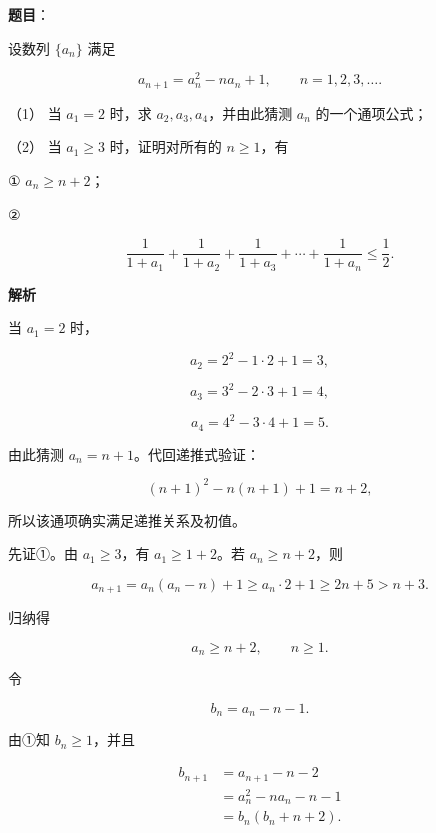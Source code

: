 \begin{answer}

\textbf{题目}：

设数列 $\{a_n\}$ 满足

\nopagebreak[4]
\[
a_{n+1}=a_n^2-na_n+1,\qquad n=1,2,3,\ldots.
\]

（1） 当 $a_1=2$ 时，求 $a_2,a_3,a_4$，并由此猜测 $a_n$ 的一个通项公式；

（2） 当 $a_1\geqslant3$ 时，证明对所有的 $n\geqslant1$，有

① $a_n\geqslant n+2$；

②

\nopagebreak[4]
\[
\frac1{1+a_1}+\frac1{1+a_2}+\frac1{1+a_3}+\cdots+\frac1{1+a_n}\leqslant\frac12.
\]

\textbf{解析}


当 $a_1=2$ 时，

\nopagebreak[4]
\[
a_2=2^2-1\cdot2+1=3,
\]

\nopagebreak[4]
\[
a_3=3^2-2\cdot3+1=4,
\]

\nopagebreak[4]
\[
a_4=4^2-3\cdot4+1=5.
\]

由此猜测 $a_n=n+1$。代回递推式验证：

\nopagebreak[4]
\[
(n+1)^2-n(n+1)+1=n+2,
\]

所以该通项确实满足递推关系及初值。


先证①。由 $a_1\geqslant3$，有 $a_1\geqslant1+2$。若 $a_n\geqslant n+2$，则

\nopagebreak[4]
\[
a_{n+1}=a_n(a_n-n)+1
\geqslant a_n\cdot2+1
\geqslant2n+5
>n+3.
\]

归纳得

\nopagebreak[4]
\[
a_n\geqslant n+2,\qquad n\geqslant1.
\]

令

\nopagebreak[4]
\[
b_n=a_n-n-1.
\]

由①知 $b_n\geqslant1$，并且

\nopagebreak[4]
\[
\begin{aligned}
b_{n+1}
&=a_{n+1}-n-2\\
&=a_n^2-na_n-n-1\\
&=b_n(b_n+n+2).
\end{aligned}
\]


\end{answer}
